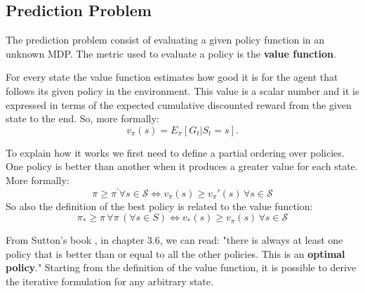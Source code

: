 \subsection{Prediction Problem}
The prediction problem consist of evaluating a given policy function in an unknown MDP.
The metric used to evaluate a policy is the \textbf{value function}.

For every state the value function estimates how good it is for the agent that follows its given policy in the environment.
This value is a scalar number and it is expressed in terms of the expected cumulative discounted reward from the given state to the end.  
So, more formally:
\begin{equation*}
v_\pi(s) = E_\pi \left[ G_t | S_t = s \right]. 
\end{equation*}

To explain how it works we first need to define a partial ordering over policies. 
One policy is better than another when it produces a greater value for each state. 
More formally: 
\begin{equation*}
\pi \geqslant \pi^{'} \forall s \in \mathcal{S} \iff v_\pi(s)  \geqslant  v_\pi'(s) \, \forall s \in \mathcal{S}
\end{equation*}
So also the definition of the best policy is related to the value function:
\begin{equation*}
\pi_* \geqslant \pi \, \forall \pi \, (\forall s \in S) \iff v_*(s)  \geqslant  v_\pi(s)\, \forall s \in \mathcal{S}
\end{equation*}

From Sutton's book \cite{bib:2018Sutton_RLBook}, in chapter 3.6, we can read: "there is always at least one policy that is better than or equal to all the other policies. This is an \textbf{optimal policy}." 
Starting from the definition of the value function, it is possible to derive the iterative formulation for any arbitrary state.

